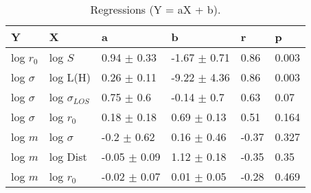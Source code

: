 \begin{table}
\centering
\caption{Regressions (Y = aX + b).}
\begin{tabular}{llllll}
\toprule
            Y &                   X &                 a &                 b &      r &      p \\
\midrule
    log $r_0$ &             log $S$ &   0.94 $\pm$ 0.33 &  -1.67 $\pm$ 0.71 &   0.86 &  0.003 \\
 log $\sigma$ &            log L(H) &   0.26 $\pm$ 0.11 &  -9.22 $\pm$ 4.36 &   0.86 &  0.003 \\
 log $\sigma$ &  log $\sigma_{LOS}$ &    0.75 $\pm$ 0.6 &   -0.14 $\pm$ 0.7 &   0.63 &   0.07 \\
 log $\sigma$ &         log $r_{0}$ &   0.18 $\pm$ 0.18 &   0.69 $\pm$ 0.13 &   0.51 &  0.164 \\
      log $m$ &        log $\sigma$ &   -0.2 $\pm$ 0.62 &   0.16 $\pm$ 0.46 &  -0.37 &  0.327 \\
      log $m$ &            log Dist &  -0.05 $\pm$ 0.09 &   1.12 $\pm$ 0.18 &  -0.35 &   0.35 \\
      log $m$ &         log $r_{0}$ &  -0.02 $\pm$ 0.07 &   0.01 $\pm$ 0.05 &  -0.28 &  0.469 \\
\bottomrule
\end{tabular}
\end{table}
